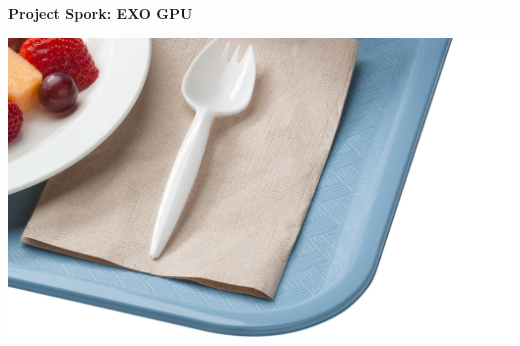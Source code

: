 



{\hfill \LARGE \textbf{\textsf{Project Spork: EXO GPU}}}

\includegraphics[width=\linewidth]{usda_spork.jpg}

\newpage


